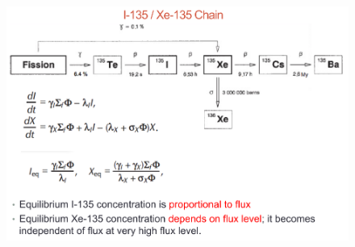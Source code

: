 \documentclass{school-22.211-notes}
\begin{document}
\clearpage
{}
\begin{figure}[ht]
  \centering
  \includegraphics[width=5in]{images/dfs/I-Xe.png}
\end{figure}
\end{document}
